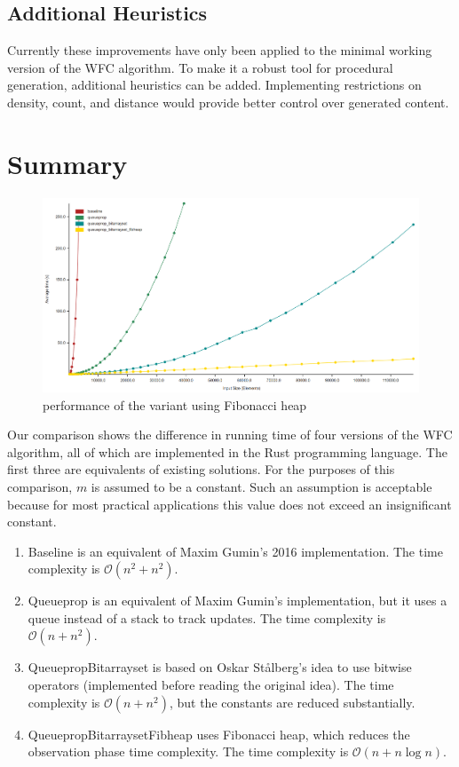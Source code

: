 \documentclass[shortabstract, english, inz]{iithesis}
\begin{document}
\section{Additional Heuristics}
Currently these improvements have only been applied to the minimal working version of the WFC algorithm. To make it a robust tool for procedural generation, additional heuristics can be added. Implementing restrictions on density, count, and distance would provide better control over generated content.

\chapter{Summary}
\begin{figure}[H]
\centering
\includegraphics[width=1\textwidth, angle=0]{images/summary.png}
\caption{performance of the variant using Fibonacci heap}
\label{fig:summary}
\end{figure}
Our comparison shows the difference in  running time of four versions of the WFC algorithm, all of which are implemented in the Rust programming language. The first three are equivalents of existing solutions. For the purposes of this comparison, \(m\) is assumed to be a constant. Such an assumption is acceptable because for most practical applications this value does not exceed an insignificant constant.
\begin{enumerate}
    \item Baseline is an equivalent of Maxim Gumin's 2016 implementation. The time complexity is \(\mathcal{O}(n^2 + n^2)\).
    \item Queueprop is an equivalent of Maxim Gumin's implementation, but it uses a queue instead of a stack to track updates. The time complexity is \(\mathcal{O}(n + n^2)\).
    \item QueuepropBitarrayset is based on Oskar Stålberg's idea to use bitwise operators (implemented before reading the original idea). The time complexity is \(\mathcal{O}(n + n^2)\), but the constants are reduced substantially.
    \item \label{fibheap}QueuepropBitarraysetFibheap uses Fibonacci heap, which reduces the observation phase time complexity. The time complexity is \(\mathcal{O}(n + n\log{n})\).
\end{enumerate}
\end{document}
